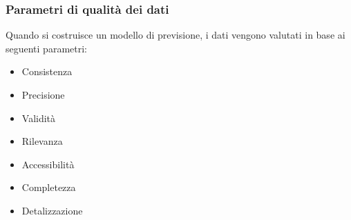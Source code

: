 \documentclass[12pt,a4paper]{report}
\begin{document}
\subsubsection{Parametri di qualità dei dati}
Quando si costruisce un modello di previsione, i dati vengono valutati in base ai seguenti parametri:
\begin{itemize}
    \item Consistenza
    \item Precisione
    \item Validità
    \item Rilevanza
    \item Accessibilità
    \item Completezza
    \item Detalizzazione
\end{itemize}
\end{document}
